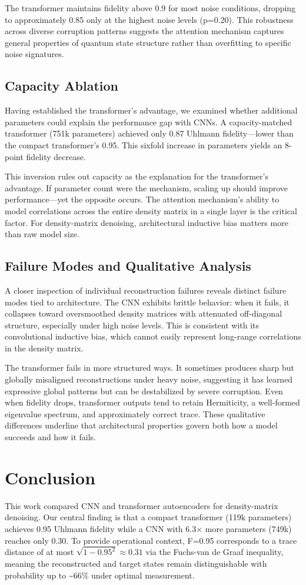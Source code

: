 \documentclass[a4paper, 11pt, colorlinks=true, citecolor=., linkcolor=black, urlcolor=black]{article}
\begin{document}
The transformer maintains fidelity above 0.9 for most noise conditions, dropping to approximately 0.85 only at the highest noise levels (p=0.20). This robustness across diverse corruption patterns suggests the attention mechanism captures general properties of quantum state structure rather than overfitting to specific noise signatures.
\subsection{Capacity Ablation}
\label{sec:orgdeabc8c}

Having established the transformer's advantage, we examined whether additional parameters could explain the performance gap with CNNs. A capacity-matched transformer (751k parameters) achieved only 0.87 Uhlmann fidelity—lower than the compact transformer's 0.95. This sixfold increase in parameters yields an 8-point fidelity decrease.

This inversion rules out capacity as the explanation for the transformer's advantage. If parameter count were the mechanism, scaling up should improve performance—yet the opposite occurs. The attention mechanism's ability to model correlations across the entire density matrix in a single layer is the critical factor. For density-matrix denoising, architectural inductive bias matters more than raw model size.
\subsection{Failure Modes and Qualitative Analysis}
\label{sec:orgee76fb6}
A closer inspection of individual reconstruction failures reveals distinct failure modes tied to architecture. The CNN exhibits brittle behavior: when it fails, it collapses toward oversmoothed density matrices with attenuated off-diagonal structure, especially under high noise levels. This is consistent with its convolutional inductive bias, which cannot easily represent long-range correlations in the density matrix.

The transformer fails in more structured ways. It sometimes produces sharp but globally misaligned reconstructions under heavy noise, suggesting it has learned expressive global patterns but can be destabilized by severe corruption. Even when fidelity drops, transformer outputs tend to retain Hermiticity, a well-formed eigenvalue spectrum, and approximately correct trace. These qualitative differences underline that architectural properties govern both how a model succeeds and how it fails.
\section{Conclusion}
\label{sec:org9a7702d}
This work compared CNN and transformer autoencoders for density-matrix denoising. Our central finding is that a compact transformer (119k parameters) achieves 0.95 Uhlmann fidelity while a CNN with 6.3× more parameters (749k) reaches only 0.30. To provide operational context, F=0.95 corresponds to a trace distance of at most \(\sqrt{1-0.95^2} \approx 0.31\) via the Fuchs-van de Graaf inequality, meaning the reconstructed and target states remain distinguishable with probability up to \textasciitilde{}66\% under optimal measurement.
\end{document}

